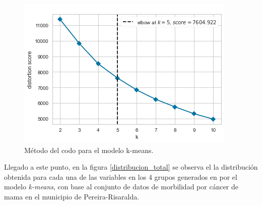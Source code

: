 \begin{figure}[h!]
	\centering
	\includegraphics[width=1
	\linewidth]{IMAGENES/Elbow}
	\caption{Método del codo para el modelo k-means.}
	\label{Elbow}
\end{figure} 

Llegado a este punto, en la figura \ref{distribucion_total} se observa el la distribución obtenida para cada una de las variables en los 4 grupos generados en por el modelo \textit{k-means}, con base al conjunto de datos de morbilidad por cáncer de mama en el municipio de Pereira-Risaralda.

